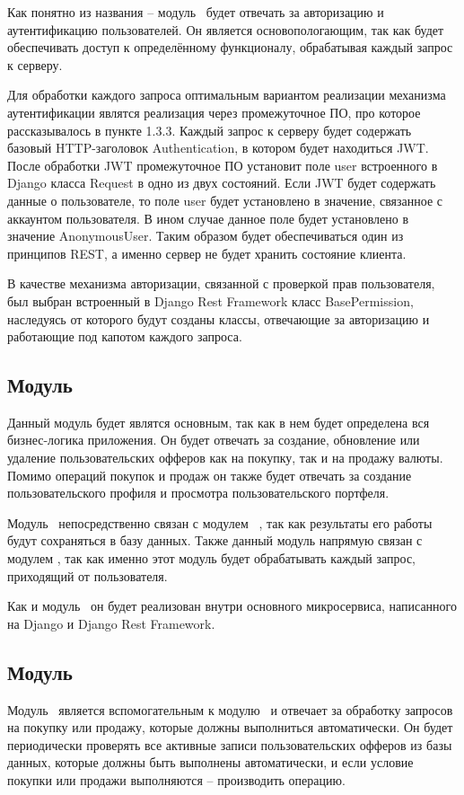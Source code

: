 Как понятно из названия -- модуль \moduleAuth ~будет отвечать за авторизацию и аутентификацию пользователей.
Он является основопологающим, так как будет обеспечивать доступ к определённому функционалу, обрабатывая каждый запрос к серверу.

Для обработки каждого запроса оптимальным вариантом реализации механизма аутентификации являтся реализация через промежуточное ПО,
про которое рассказывалось в пункте 1.3.3.
Каждый запрос к серверу будет содержать базовый HTTP-заголовок Authentication, в котором будет находиться JWT.
После обработки JWT промежуточное ПО установит поле user встроенного в Django класса Request в одно из двух состояний.
Если JWT будет содержать данные о пользователе, то поле user будет установлено в значение, связанное с аккаунтом пользователя.
В ином случае данное поле будет установлено в значение AnonymousUser.
Таким образом будет обеспечиваться один из принципов REST, а именно сервер не будет хранить состояние клиента.

В качестве механизма авторизации, связанной с проверкой прав пользователя, был выбран встроенный в Django Rest Framework класс BasePermission,
наследуясь от которого будут созданы классы, отвечающие за авторизацию и работающие под капотом каждого запроса.

\subsection{Модуль \moduleTrading}\label{subsec:sys:module-trading}
Данный модуль будет являтся основным, так как в нем будет определена вся бизнес-логика приложения.
Он будет отвечать за создание, обновление или удаление пользовательских офферов как на покупку, так и на продажу валюты.
Помимо операций покупок и продаж он также будет отвечать за создание пользовательского профиля и просмотра пользовательского портфеля.

Модуль \moduleTrading ~непосредственно связан с модулем ~\moduleCommunicationPostgres, так как результаты его работы будут сохраняться в базу данных.
Также данный модуль напрямую связан с модулем \moduleAuth, так как именно этот модуль будет обрабатывать каждый запрос, приходящий от пользователя.

Как и модуль \moduleAuth ~он будет реализован внутри основного микросервиса, написанного на Django и Django Rest Framework.

\subsection{Модуль \moduleAutoTrading}\label{subsec:sys:module-auto-trading}
Модуль \moduleAutoTrading ~является вспомогательным к модулю \moduleTrading ~и отвечает за обработку запросов на покупку или продажу, которые должны выполниться автоматически.
Он будет периодически проверять все активные записи пользовательских офферов из базы данных, которые должны быть выполнены автоматически, и если условие покупки или продажи выполняются -- производить операцию.


